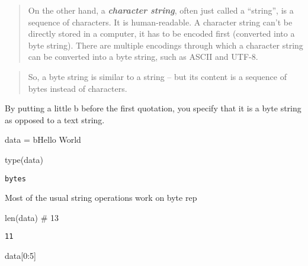 \documentclass[
  letterpaper,
  DIV=11,
  numbers=noendperiod]{scrreprt}
\newenvironment{Shaded}{\begin{snugshade}}{\end{snugshade}}
\newcommand{\BuiltInTok}[1]{\textcolor[rgb]{0.00,0.46,0.62}{#1}}
\newcommand{\CommentTok}[1]{\textcolor[rgb]{0.37,0.37,0.37}{#1}}
\newcommand{\DecValTok}[1]{\textcolor[rgb]{0.68,0.00,0.00}{#1}}
\newcommand{\NormalTok}[1]{\textcolor[rgb]{0.00,0.46,0.62}{#1}}
\newcommand{\OperatorTok}[1]{\textcolor[rgb]{0.37,0.37,0.37}{#1}}
\newcommand{\StringTok}[1]{\textcolor[rgb]{0.13,0.47,0.30}{#1}}
\begin{document}
\begin{quote}
On the other hand, a \emph{\textbf{character string}}, often just called
a ``string'', is a sequence of characters. It is human-readable. A
character string can't be directly stored in a computer, it has to be
encoded first (converted into a byte string). There are multiple
encodings through which a character string can be converted into a byte
string, such as ASCII and UTF-8.
\end{quote}

\begin{quote}
So, a byte string is similar to a string -- but its content is a
sequence of bytes instead of characters.
\end{quote}

By putting a little b before the first quotation, you specify that it is
a byte string as opposed to a text string.

\begin{Shaded}
\begin{Highlighting}[]
\NormalTok{data }\OperatorTok{=} \StringTok{b\textquotesingle{}Hello World\textquotesingle{}}
\end{Highlighting}
\end{Shaded}

\begin{Shaded}
\begin{Highlighting}[]
\BuiltInTok{type}\NormalTok{(data)}
\end{Highlighting}
\end{Shaded}

\begin{verbatim}
bytes
\end{verbatim}

Most of the usual string operations work on byte rep

\begin{Shaded}
\begin{Highlighting}[]
\BuiltInTok{len}\NormalTok{(data)                         }\CommentTok{\# 13}
\end{Highlighting}
\end{Shaded}

\begin{verbatim}
11
\end{verbatim}

\begin{Shaded}
\begin{Highlighting}[]
\NormalTok{data[}\DecValTok{0}\NormalTok{:}\DecValTok{5}\NormalTok{]                         }
\end{Highlighting}
\end{Shaded}
\end{document}
